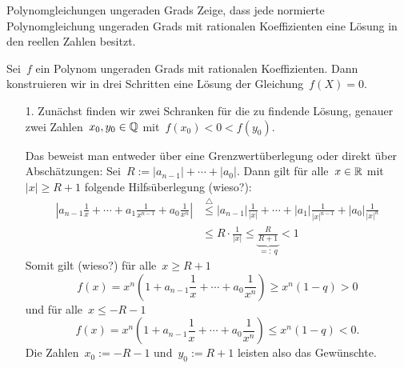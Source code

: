 \documentclass{algblatt}
\begin{document}
\begin{aufgabe}{Polynomgleichungen ungeraden Grads}
Zeige, dass jede normierte Polynomgleichung ungeraden Grads mit rationalen
Koeffizienten eine Lösung in den reellen Zahlen besitzt.
\begin{loesung}Sei~$f$ ein Polynom ungeraden Grads mit rationalen
Koeffizienten. Dann konstruieren wir in drei Schritten eine Lösung der
Gleichung~$f(X) = 0$.
\begin{enumerate}
\item[1.] Zunächst finden wir zwei Schranken für die zu findende Lösung, genauer
zwei Zahlen~$x_0, y_0 \in \mathbb{Q}$ mit~$f(x_0) < 0 < f(y_0)$.

Das beweist man entweder über eine Grenzwertüberlegung oder direkt über
Abschätzungen: Sei~$R := |a_{n-1}| + \cdots + |a_0|$. Dann gilt für
alle~$x \in \mathbb{R}$ mit~$|x| \geq R + 1$ folgende Hilfsüberlegung (wieso?):
\begin{align*}
  \left|a_{n-1} \frac{1}{x} + \cdots + a_1 \frac{1}{x^{n-1}} + a_0
  \frac{1}{x^n}\right| &\stackrel{\triangle}{\leq}
  |a_{n-1}| \frac{1}{|x|} + \cdots + |a_1| \frac{1}{|x|^{n-1}} + |a_0|
  \frac{1}{|x|^n} \\
  &\leq R \cdot \frac{1}{|x|}
  \leq \underbrace{\frac{R}{R+1}}_{=:\,q} < 1
\end{align*}
Somit gilt (wieso?) für alle~$x \geq R + 1$
\[ f(x) = x^n \left(1 + a_{n-1} \frac{1}{x} + \cdots + a_0 \frac{1}{x^n}\right)
  \geq x^n \left(1 - q\right) > 0 \]
und für alle~$x \leq -R - 1$
\[ f(x) = x^n \left(1 + a_{n-1} \frac{1}{x} + \cdots + a_0 \frac{1}{x^n}\right)
  \leq x^n \left(1 - q\right) < 0. \]
Die Zahlen~$x_0 := -R - 1$ und~$y_0 := R + 1$ leisten also das Gewünschte.


\end{enumerate}
\end{loesung}
\end{aufgabe}
\end{document}
